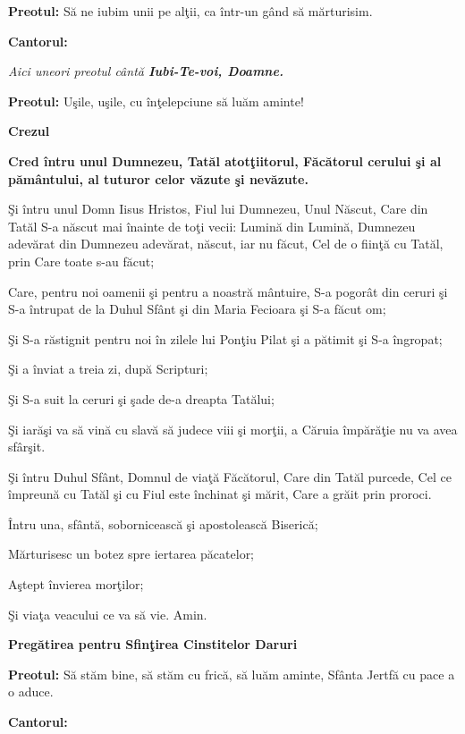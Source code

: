 \documentclass[11pt,letterpaper]{book} \usepackage{ucs}
\newcommand{\mysection}[1]{\begin{center}{\Large \bf #1}\end{center}}
\begin{document}
  {\bf Preotul:} Să ne iubim unii pe alţii, ca într-un gând să
  mărturisim.
  \pagebreak

  {\bf Cantorul:}


  {\em Aici uneori preotul cântă {\bf Iubi-Te-voi, Doamne.}}

  {\bf Preotul:} Uşile, uşile, cu înţelepciune să luăm aminte!
  
  \mysection{Crezul}

  {\large \bf
    Cred întru unul Dumnezeu, Tatăl atotţiitorul, Făcătorul cerului şi
    al pământului, al tuturor celor văzute şi nevăzute.
    
    Şi întru unul Domn Iisus Hristos, Fiul lui Dumnezeu, Unul Născut,
    Care din Tatăl S-a născut mai înainte de toţi vecii: Lumină din
    Lumină, Dumnezeu adevărat din Dumnezeu adevărat, născut, iar nu
    făcut, Cel de o fiinţă cu Tatăl, prin Care toate s-au făcut;
    
    Care, pentru noi oamenii şi pentru a noastră mântuire, S-a pogorât
    din ceruri şi S-a întrupat de la Duhul Sfânt şi din Maria Fecioara
    şi S-a făcut om;
    
    Şi S-a răstignit pentru noi în zilele lui Ponţiu Pilat şi a pătimit
    şi S-a îngropat;
    
    Şi a înviat a treia zi, după Scripturi;
    
    Şi S-a suit la ceruri şi şade de-a dreapta Tatălui;
    
    Şi iarăşi va să vină cu slavă să judece viii şi morţii, a Căruia
    împărăţie nu va avea sfârşit.
    
    Şi întru Duhul Sfânt, Domnul de viaţă Făcătorul, Care din Tatăl
    purcede, Cel ce împreună cu Tatăl şi cu Fiul este închinat şi mărit,
    Care a grăit prin proroci.
    
    Întru una, sfântă, sobornicească şi apostolească Biserică;
    
    Mărturisesc un botez spre iertarea păcatelor;
    
    Aştept învierea morţilor;
    
    Şi viaţa veacului ce va să vie. Amin.
  }
  \pagebreak

  \mysection{Pregătirea pentru Sfinţirea Cinstitelor Daruri}

  {\bf Preotul:} Să stăm bine, să stăm cu frică, să luăm aminte,
  Sfânta Jertfă cu pace a o aduce.

  {\bf Cantorul:}
  \begin{center}
  \end{center}
\end{document}
